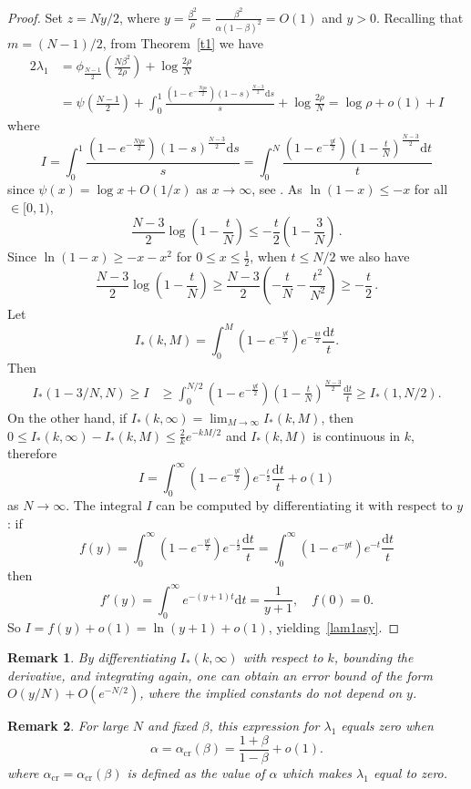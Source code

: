 \documentclass[12pt]{article}
\newtheorem{remark}{Remark}
\renewcommand{\a}{\alpha}
\newcommand{\1}{\mathbf{1}}
\begin{document}
\begin{proof}
Set $z=Ny/2$, where $y=\frac{\beta^2}{\rho}=\frac{\beta^2}{\alpha(1-\beta)^2}=O(1)$ and $y > 0$. Recalling that $m=(N-1)/2$,  from Theorem~\ref{t1} we have
\begin{align*}
2\lambda_1&=\phi_{\frac{N-1}2}\left(\frac{N\beta^2}{2\rho}\right)+\log \frac{2\rho}N\\
&=\psi\left(\frac{N-1}2\right)
+\int_0^1 \frac{\left(1-e^{-\frac{Nys}2}\right)(1-s)^{\frac{N-3}2}\mathrm{d}s}s
+\log\frac{2\rho}N
=\log \rho +o(1)
+I
\end{align*}
where
$$
I=\int_0^1 \frac{\left(1-e^{-\frac{Nys}2}\right)(1-s)^{\frac{N-3}2}\mathrm{d}s}s=
  \int_0^N \frac{(1-e^{-\frac{yt}2})\left(1-\frac{t}N\right)^{\frac{N-3}2}\mathrm{d}t}t 
$$
since $\psi(x)=\log x+ O(1/x)$ as $x \to \infty$, see \cite[6.3.21]{AS}.
As $\ln(1-x)\le -x$ for all $\in[0,1)$, 
$$
 \frac{N-3}2\log\left(1-\frac tN\right)
\le
-\frac{t}2\left(1-\frac3N\right)\,.
$$
Since $\ln(1-x)\ge -x-x^2$ for $0 \le x \le \frac{1}{2}$, when $t \le N/2$ we also have
$$
\frac{N-3}2\log\left(1-\frac tN\right)\ge
\frac{N-3}2\left(-\frac tN-\frac {t^2}{N^2}\right)
\ge -\frac t2\,.
$$
Let 
$$
I_*(k,M)=\int_0^M \left(1-e^{-\frac{yt}2}\right)e^{-\frac{kt}2}\frac{\mathrm{d}t}t .
$$
Then
\begin{align*}
 I_*(1-3/N,N)\ge 
I& \ge \int_0^{N/2}\left(1-e^{-\frac{yt}2}\right)\left(1-\frac tN\right)^{\frac{N-3}{2}}\frac{\mathrm{d}t}t 
\ge I_*(1,N/2).
\end{align*}
On the other hand, if $I_*(k,\infty)=\lim_{M\to\infty} I_*(k,M)$, then $0\le I_*(k,\infty)-I_*(k,M)\le \frac2k e^{-kM/2}$ and $I_*(k,M)$ is continuous in $k$, therefore
$$
I=\int_0^\infty \left(1-e^{-\frac{yt}2}\right)e^{-\frac{t}2}\frac{\mathrm{d}t}t +o(1) 
$$
as $N\to\infty$. The integral $I$ can be computed by differentiating it with respect to $y$: if 
$$
f(y)=\int_0^\infty \left(1-e^{-\frac{yt}2}\right)e^{-\frac{t}2}\frac{\mathrm{d}t}t
=\int_0^\infty \left(1-e^{-yt}\right)e^{-t}\frac{\mathrm{d}t}t
$$ then
$$
f'(y)=\int_0^\infty
e^{-(y+1)t}\mathrm{d}t=\frac1{y+1}, \quad f(0)=0.
$$
So $I=f(y) + o(1)=\ln(y+1) + o(1)$,
yielding~\eqref{lam1asy}.
\end{proof}
\begin{remark} By differentiating $I_*(k,\infty)$ with respect to $k$, bounding the derivative, and integrating again, one can obtain an error bound of the form $O(y/N) + O(e^{-N/2})$, where the implied constants do not depend on $y$.
\end{remark}
\begin{remark}
For large $N$ and fixed $\beta$, this expression for $\lambda_1$ equals zero when
$$
\alpha=\alpha_\mathrm{cr}(\beta)= \frac{1+\beta}{1-\beta}+o(1).%
$$
where $\alpha_\mathrm{cr}=\alpha_\mathrm{cr}(\beta)$ is defined as the value of $\a$ which makes $\lambda_1$ equal to zero. 
\end{remark}
\end{document}
